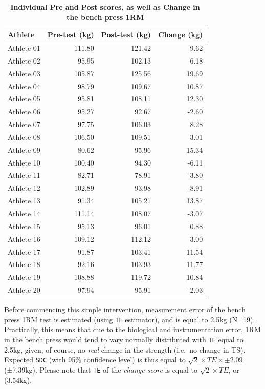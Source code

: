 \documentclass[
]{book}
\begin{document}
\begin{table}

\caption{\label{tab:bench-press-1RM-pre-post-repeated}\textbf{Individual Pre and Post scores, as well as Change in the bench press 1RM}}
\centering
\begin{tabular}[t]{lrrr}
\toprule
Athlete & Pre-test (kg) & Post-test (kg) & Change (kg)\\
\midrule
Athlete 01 & 111.80 & 121.42 & 9.62\\
Athlete 02 & 95.95 & 102.13 & 6.18\\
Athlete 03 & 105.87 & 125.56 & 19.69\\
Athlete 04 & 98.79 & 109.67 & 10.87\\
Athlete 05 & 95.81 & 108.11 & 12.30\\
\addlinespace
Athlete 06 & 95.27 & 92.67 & -2.60\\
Athlete 07 & 97.75 & 106.03 & 8.28\\
Athlete 08 & 106.50 & 109.51 & 3.01\\
Athlete 09 & 80.62 & 95.96 & 15.34\\
Athlete 10 & 100.40 & 94.30 & -6.11\\
\addlinespace
Athlete 11 & 82.71 & 78.91 & -3.80\\
Athlete 12 & 102.89 & 93.98 & -8.91\\
Athlete 13 & 91.34 & 105.21 & 13.87\\
Athlete 14 & 111.14 & 108.07 & -3.07\\
Athlete 15 & 95.13 & 96.01 & 0.88\\
\addlinespace
Athlete 16 & 109.12 & 112.12 & 3.00\\
Athlete 17 & 91.87 & 103.41 & 11.54\\
Athlete 18 & 92.16 & 103.93 & 11.77\\
Athlete 19 & 108.88 & 119.72 & 10.84\\
Athlete 20 & 97.94 & 95.91 & -2.03\\
\bottomrule
\end{tabular}
\end{table}

Before commencing this simple intervention, measurement error of the bench press 1RM test is estimated (using \texttt{TE} estimator), and is equal to 2.5kg (N=19). Practically, this means that due to the biological and instrumentation error, 1RM in the bench press would tend to vary normally distributed with \texttt{TE} equal to 2.5kg, given, of course, no \emph{real} change in the strength (i.e.~no change in TS). Expected \texttt{SDC} (with 95\% confidence level) is thus equal to \(\sqrt{2}\times TE \times \pm2.09\) (±7.39kg). Please note that \texttt{TE} of the \emph{change score} is equal to \(\sqrt{2}\times TE\), or (3.54kg).
\end{document}
